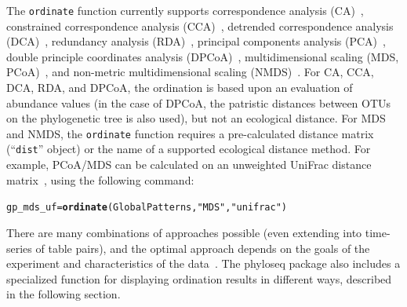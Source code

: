 \documentclass[10pt]{article}\usepackage{graphicx, color}
\makeatletter
\newcommand{\hlfunctioncall}[1]{\textcolor[rgb]{0,0,0}{\textbf{#1}}}%
\newcommand{\hlstring}[1]{\textcolor[rgb]{0,0,0}{#1}}%
\newenvironment{kframe}{%
 \def\at@end@of@kframe{}%
 \ifinner\ifhmode%
  \def\at@end@of@kframe{\end{minipage}}%
  \begin{minipage}{\columnwidth}%
 \fi\fi%
 \def\FrameCommand##1{\hskip\@totalleftmargin \hskip-\fboxsep
 \colorbox{shadecolor}{##1}\hskip-\fboxsep
     \hskip-\linewidth \hskip-\@totalleftmargin \hskip\columnwidth}%
 \MakeFramed {\advance\hsize-\width
   \@totalleftmargin\z@ \linewidth\hsize
   \@setminipage}}%
 {\par\unskip\endMakeFramed%
 \at@end@of@kframe}
\newenvironment{knitrout}{}{} %
\newcommand{\code}[1]{{\texttt{#1}}}
\makeatother
\begin{document}
The \code{ordinate} function currently supports
correspondence analysis (CA)~\cite{Greenacre:1984}, 
constrained correspondence analysis (CCA)~\cite{Braak:1986fr}, 
detrended correspondence analysis (DCA)~\cite{Hill:1980wk}, 
redundancy analysis (RDA)~\cite{Wollenberg:1977im}, 
principal components analysis (PCA)~\cite{Hotelling:1933ki}, 
double principle coordinates analysis (DPCoA)~\cite{Pavoine:2004}, 
multidimensional scaling (MDS, PCoA)~\cite{gower:1966hi}, 
and non-metric multidimensional scaling (NMDS)~\cite{Minchin:1987fl}. 
For CA, CCA, DCA, RDA, and DPCoA,
the ordination is based upon an evaluation of abundance values
(in the case of DPCoA, the patristic distances between OTUs
on the phylogenetic tree is also used), 
but not an ecological distance.
For MDS and NMDS, the \code{ordinate} function requires
a pre-calculated distance matrix (``\code{dist}'' object)
or the name of a supported ecological distance method.
For example, PCoA/MDS can be calculated on
an unweighted UniFrac distance matrix~\cite{Lozupone:2005unifrac}, 
using the following command:

\begin{knitrout}
\color{fgcolor}\begin{kframe}
\begin{alltt}
gp_mds_uf = \hlfunctioncall{ordinate}(GlobalPatterns, \hlstring{"MDS"}, \hlstring{"unifrac"})
\end{alltt}
\end{kframe}
\end{knitrout}


There are many combinations of approaches possible
(even extending into time-series of table pairs),
and the optimal approach depends on the goals of the experiment
and characteristics of the data~\cite{Thioulouse2011}.
The phyloseq package also includes a specialized function
for displaying ordination results in different ways,
described in the following section.
\end{document}
